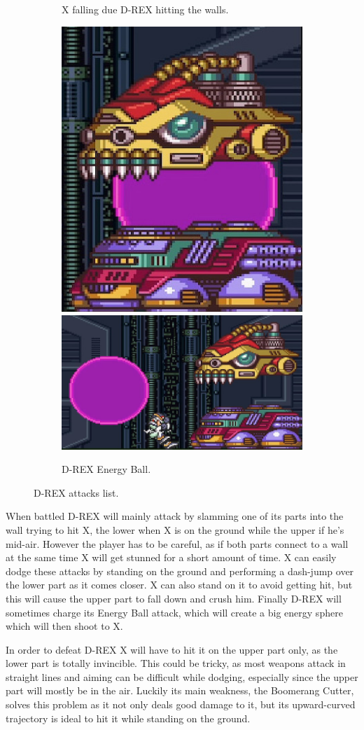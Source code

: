 \begin{figure}[htp]
\begin{subfigure}[t]{0.40\linewidth}
		\caption{X falling due D-REX hitting the walls.}
	\end{subfigure}
	\begin{subfigure}{\linewidth}
		\centering
		\includegraphics[width=0.26\linewidth]{figures/X1/Sigma_stages/Drex_laser_1.jpg}
		\includegraphics[width=0.55\linewidth]{figures/X1/Sigma_stages/Drex_laser_2.jpg}
		\caption{D-REX Energy Ball.}
	\end{subfigure}
	\caption{D-REX attacks list.}
\end{figure} 

When battled D-REX will mainly attack by slamming one of its parts into the wall trying to hit X, the lower when X is on the ground while the upper if he's mid-air. However the player has to be careful, as if both parts connect to a wall at the same time X will get stunned for a short amount of time. X can easily dodge these attacks by standing on the ground and performing a dash-jump over the lower part as it comes closer. X can also stand on it to avoid getting hit, but this will cause the upper part to fall down and crush him. Finally D-REX will sometimes charge its Energy Ball attack, which will create a big energy sphere which will then shoot to X.

In order to defeat D-REX X will have to hit it on the upper part only, as the lower part is totally invincible. This could be tricky, as most weapons attack in straight lines and aiming can be difficult while dodging, especially since the upper part will mostly be in the air. Luckily its main weakness, the Boomerang Cutter, solves this problem as it not only deals good damage to it, but its upward-curved trajectory is ideal to hit it while standing on the ground.

